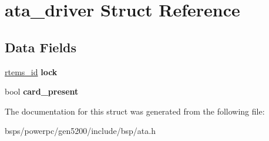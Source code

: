 \hypertarget{structata__driver}{}\section{ata\+\_\+driver Struct Reference}
\label{structata__driver}
\subsection*{Data Fields}
\begin{DoxyCompactItemize}
\item 
\mbox{\label{structata__driver_af21727f5d31c0a1d0c58f75324e7c1e0}} 
\mbox{\hyperlink{group__ClassicTasks_gab20892b814dced7dd4e5b9bf42becd57}{rtems\+\_\+id}} {\bfseries lock}
\item 
\mbox{\label{structata__driver_a3bb56d8f07b7e0392bb360ee5ce9b8cc}} 
bool {\bfseries card\+\_\+present}
\end{DoxyCompactItemize}


The documentation for this struct was generated from the following file\+:\begin{DoxyCompactItemize}
\item 
bsps/powerpc/gen5200/include/bsp/ata.\+h\end{DoxyCompactItemize}
